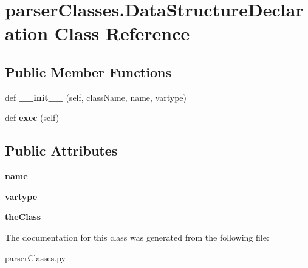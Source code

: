 \hypertarget{classparser_classes_1_1_data_structure_declaration}{}\section{parser\+Classes.\+Data\+Structure\+Declaration Class Reference}
\label{classparser_classes_1_1_data_structure_declaration}
\subsection*{Public Member Functions}
\begin{DoxyCompactItemize}
\item 
def {\bfseries \+\_\+\+\_\+init\+\_\+\+\_\+} (self, class\+Name, name, vartype)\hypertarget{classparser_classes_1_1_data_structure_declaration_abf31307e4d0cb3dadb9309182def6a2b}{}\label{classparser_classes_1_1_data_structure_declaration_abf31307e4d0cb3dadb9309182def6a2b}

\item 
def {\bfseries exec} (self)\hypertarget{classparser_classes_1_1_data_structure_declaration_ab2fa0b82dbfc8fc1cfc49ba21bf02977}{}\label{classparser_classes_1_1_data_structure_declaration_ab2fa0b82dbfc8fc1cfc49ba21bf02977}

\end{DoxyCompactItemize}
\subsection*{Public Attributes}
\begin{DoxyCompactItemize}
\item 
{\bfseries name}\hypertarget{classparser_classes_1_1_data_structure_declaration_a72028991597dde706393f738e06687a2}{}\label{classparser_classes_1_1_data_structure_declaration_a72028991597dde706393f738e06687a2}

\item 
{\bfseries vartype}\hypertarget{classparser_classes_1_1_data_structure_declaration_adfc5633b6c9fb8292f8c9e59b2c2ab2d}{}\label{classparser_classes_1_1_data_structure_declaration_adfc5633b6c9fb8292f8c9e59b2c2ab2d}

\item 
{\bfseries the\+Class}\hypertarget{classparser_classes_1_1_data_structure_declaration_abfaff3bb31319c434bb7c37702dd2a93}{}\label{classparser_classes_1_1_data_structure_declaration_abfaff3bb31319c434bb7c37702dd2a93}

\end{DoxyCompactItemize}


The documentation for this class was generated from the following file\+:\begin{DoxyCompactItemize}
\item 
parser\+Classes.\+py\end{DoxyCompactItemize}
